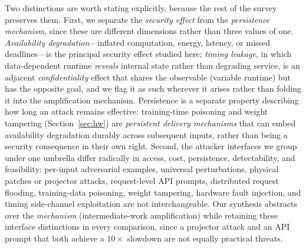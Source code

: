 \documentclass[acmsmall,screen,review,nonacm]{acmart}
\begin{document}
Two distinctions are worth stating explicitly, because the rest of the survey preserves them. First, we separate the \emph{security effect} from the \emph{persistence mechanism}, since these are different dimensions rather than three values of one. \emph{Availability degradation}---inflated computation, energy, latency, or missed deadlines---is the principal security effect studied here; \emph{timing leakage}, in which data-dependent runtime \emph{reveals} internal state rather than degrading service, is an adjacent \emph{confidentiality} effect that shares the observable (variable runtime) but has the opposite goal, and we flag it as such wherever it arises rather than folding it into the amplification mechanism. Persistence is a separate property describing how long an attack remains effective: training-time poisoning and weight tampering (Section~\ref{sec:hw}) are \emph{persistent delivery mechanisms} that can embed availability degradation durably across subsequent inputs, rather than being a security consequence in their own right. Second, the attacker interfaces we group under one umbrella differ radically in access, cost, persistence, detectability, and feasibility: per-input adversarial examples, universal perturbations, physical patches or projector attacks, request-level API prompts, distributed request flooding, training-data poisoning, weight tampering, hardware fault injection, and timing side-channel exploitation are not interchangeable. Our synthesis abstracts over the \emph{mechanism} (intermediate-work amplification) while retaining these interface distinctions in every comparison, since a projector attack and an API prompt that both achieve a $10\times$ slowdown are not equally practical threats.
\end{document}
